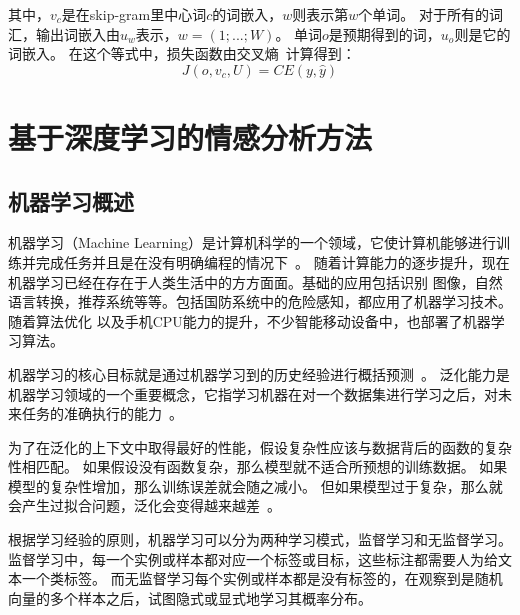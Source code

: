 其中，${v_{c}}$是在skip-gram里中心词${c}$的词嵌入，${w}$则表示第${w}$个单词。
对于所有的词汇，输出词嵌入由${u_{w}}$表示，${w=\left ( 1;...;W \right )}$。
单词${o}$是预期得到的词，${u_{o}}$则是它的词嵌入。
在这个等式中，损失函数由交叉熵~计算得到：
\begin{equation}
J\left ( o,v_{c},U \right )=CE\left ( y,\widehat{y} \right )
\end{equation}

\section{基于深度学习的情感分析方法}
\subsection{机器学习概述}
机器学习（Machine Learning）是计算机科学的一个领域，它使计算机能够进行训练并完成任务并且是在没有明确编程的情况下~。
随着计算能力的逐步提升，现在机器学习已经在存在于人类生活中的方方面面。基础的应用包括识别
图像，自然语言转换，推荐系统等等。包括国防系统中的危险感知，都应用了机器学习技术。随着算法优化
以及手机CPU能力的提升，不少智能移动设备中，也部署了机器学习算法。

机器学习的核心目标就是通过机器学习到的历史经验进行概括预测~。
泛化能力是机器学习领域的一个重要概念，它指学习机器在对一个数据集进行学习之后，对未来任务的准确执行的能力~。

为了在泛化的上下文中取得最好的性能，假设复杂性应该与数据背后的函数的复杂性相匹配。
如果假设没有函数复杂，那么模型就不适合所预想的训练数据。
如果模型的复杂性增加，那么训练误差就会随之减小。
但如果模型过于复杂，那么就会产生过拟合问题，泛化会变得越来越差~。

根据学习经验的原则，机器学习可以分为两种学习模式，监督学习和无监督学习。
监督学习中，每一个实例或样本都对应一个标签或目标，这些标注都需要人为给文本一个类标签。
而无监督学习每个实例或样本都是没有标签的，在观察到是随机向量的多个样本之后，试图隐式或显式地学习其概率分布。

